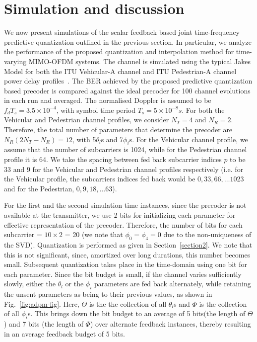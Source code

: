 \documentclass[journal,10pt,twocolumn]{IEEEtran}
\begin{document}
\section{Simulation and discussion}
\label{section3}
We now present simulations of the scalar feedback based joint
time-frequency predictive quantization outlined in the previous
section. In particular, we analyze the performance of the proposed
quantization and interpolation method for time-varying MIMO-OFDM
systems. The channel is simulated using the typical Jakes Model for
both the ITU Vehicular-A channel and ITU Pedestrian-A channel power
delay profiles~\cite{recommendation1997guidelines}. The BER achieved by the proposed predictive
quantization based precoder is compared against the ideal precoder for
100 channel evolutions in each run and averaged. The normalised
Doppler is assumed to be $f_dT_s = 3.5\times10^{-4}$, with symbol time
period $T_s = 5\times10^{-8} s$. For both the Vehicular and Pedestrian
channel profiles, we consider $N_T=4$ and $N_R=2$. Therefore, the
total number of parameters that determine the precoder are
$N_{R}(2N_{T} - N_{R}) = 12$, with 5$\theta_l$s and
7$\phi_i$s. For the Vehicular channel profile, we assume that the
number of subcarriers is 1024, while for the Pedestrian channel
profile it is 64. We take the spacing between fed back subcarrier
indices $p$ to be $33$ and $9$ for the Vehicular
and Pedestrian channel profiles respectively (i.e. for the Vehicular
profile, the subcarriers indices fed back would be $0, 33, 66, \ldots
1023$ and for the Pedestrian, $0, 9, 18, \ldots 63$).

For the first and the second simulation time instances, since the
precoder is not available at the transmitter, we use 2 bits for
initializing each parameter for effective representation of the
precoder. Therefore, the number of bits for each subcarrier =
$10\times 2$ = 20 (we note that $\phi_0 = \phi_4 = 0$ due to the
non-uniqueness of the SVD). Quantization is performed as given in
Section~\ref{section2}. We note that this is not significant, since,
amortized over long durations, this number becomes small. Subsequent
quantization takes place in the time-domain using one bit for each
parameter. Since the bit budget is small, if the channel varies
sufficiently slowly, either the $\theta_l$ or the $\phi_i$ parameters
are fed back alternately, while retaining the unsent parameters as
being to their previous values, as shown in
Fig.~\ref{fig:adpm-fig}. Here, $\Theta$ is the the collection of all
$\theta_l$s and $\Phi$ is the collection of all $\phi_i$s. This brings
down the bit budget to an average of 5 bits(the length of $\Theta$)
and 7 bits (the length of $\Phi$) over alternate feedback instances,
thereby resulting in an average feedback budget of 5 bits.
\end{document}
